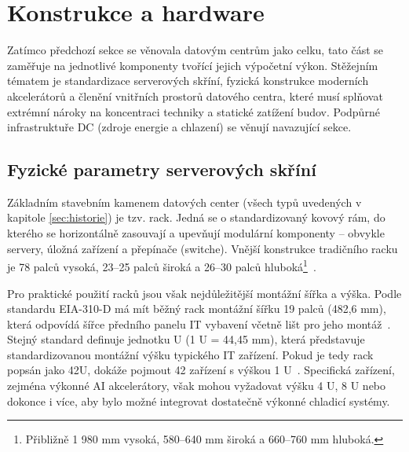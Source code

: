 \section{Konstrukce a hardware}
\label{sec:konstrukce}


Zatímco předchozí sekce se věnovala datovým centrům jako celku, tato část se zaměřuje na jednotlivé komponenty tvořící jejich výpočetní výkon. Stěžejním tématem je standardizace serverových skříní, fyzická konstrukce moderních akcelerátorů a členění vnitřních prostorů datového centra, které musí splňovat extrémní nároky na koncentraci techniky a statické zatížení budov. Podpůrné infrastruktuře DC (zdroje energie a chlazení) se věnují navazující sekce.

\subsection{Fyzické parametry serverových skříní}
\label{subsec:racky}

Základním stavebním kamenem datových center (všech typů uvedených v kapitole \ref{sec:historie}) je tzv. rack. Jedná se o standardizovaný kovový rám, do kterého se horizontálně zasouvají a upevňují modulární komponenty -- obvykle servery, úložná zařízení a přepínače (switche). Vnější konstrukce tradičního racku je 78 palců vysoká, 23--25 palců široká a 26--30 palců hluboká\footnote{Přibližně 1 980 mm vysoká, 580--640 mm široká a 660--760 mm hluboká.}~\cite[s. 2940]{kant_data_2009}.

Pro praktické použití racků jsou však nejdůležitější montážní šířka a výška. Podle standardu EIA-310-D má mít běžný rack montážní šířku 19 palců (482,6 mm), která odpovídá šířce předního panelu IT vybavení včetně lišt pro jeho montáž~\cite{hu_how_2020}. Stejný standard definuje jednotku U (1 U = 44,45 mm), která představuje standardizovanou montážní výšku typického IT zařízení. Pokud je tedy rack popsán jako 42U, dokáže pojmout 42 zařízení s výškou 1 U~\cite{hu_how_2020}. Specifická zařízení, zejména výkonné AI akcelerátory, však mohou vyžadovat výšku 4 U, 8 U nebo dokonce i více, aby bylo možné integrovat dostatečně výkonné chladicí systémy.

